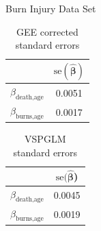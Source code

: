 \documentclass[9pt,notes=hide]{beamer}
\newcommand{\vect}[1]{\boldsymbol #1}
\newcommand{\vbe}{\vect{\beta}}
\begin{document}
\begin{frame}{Burn Injury Data Set}
	\begin{table}[h!]
		\centering
		\begin{tabular}{c|c}
			{}                                 & $\text{se}(\hat{\vbe})$ \\
			\hline
			$\beta_{\text{death}, \text{age}}$ & 0.0051                  \\
			$\beta_{\text{burns}, \text{age}}$ & 0.0017
		\end{tabular}
		\caption{GEE corrected standard errors}
		\label{tab:GEEerrors}
	\end{table}
	\begin{table}[h!]
		\centering
		\begin{tabular}{c|c}
			{}                                 & $\text{se}(\hat{\vbe}$) \\
				\hline
			$\beta_{\text{death}, \text{age}}$ & 0.0045                  \\
			$\beta_{\text{burns}, \text{age}}$ & 0.0019
		\end{tabular}
		\caption{VSPGLM standard errors}
		\label{tab:VSPGLMerrors}
	\end{table}
\end{frame}
\end{document}
